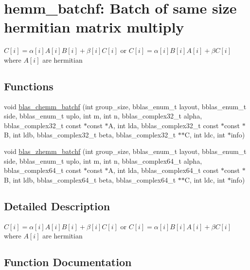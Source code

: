 \hypertarget{group__hemm__batchf}{}\section{hemm\+\_\+batchf\+: Batch of same size hermitian matrix multiply}
\label{group__hemm__batchf}


$ C[i] = \alpha[i] A[i] B[i] + \beta[i] C[i] $ or $ C[i] = \alpha[i] B[i] A[i] + \beta C[i] $ where $ A[i] $ are hermitian  


\subsection*{Functions}
\begin{DoxyCompactItemize}
\item 
void \hyperlink{group__hemm__batchf_ga76250ab55350229248296033e39c68cc}{blas\+\_\+chemm\+\_\+batchf} (int group\+\_\+size, bblas\+\_\+enum\+\_\+t layout, bblas\+\_\+enum\+\_\+t side, bblas\+\_\+enum\+\_\+t uplo, int m, int n, bblas\+\_\+complex32\+\_\+t alpha, bblas\+\_\+complex32\+\_\+t const $\ast$const $\ast$A, int lda, bblas\+\_\+complex32\+\_\+t const $\ast$const $\ast$B, int ldb, bblas\+\_\+complex32\+\_\+t beta, bblas\+\_\+complex32\+\_\+t $\ast$$\ast$C, int ldc, int $\ast$info)
\item 
void \hyperlink{group__hemm__batchf_gaf6cd524bb78c2bab51170b200b76cfa8}{blas\+\_\+zhemm\+\_\+batchf} (int group\+\_\+size, bblas\+\_\+enum\+\_\+t layout, bblas\+\_\+enum\+\_\+t side, bblas\+\_\+enum\+\_\+t uplo, int m, int n, bblas\+\_\+complex64\+\_\+t alpha, bblas\+\_\+complex64\+\_\+t const $\ast$const $\ast$A, int lda, bblas\+\_\+complex64\+\_\+t const $\ast$const $\ast$B, int ldb, bblas\+\_\+complex64\+\_\+t beta, bblas\+\_\+complex64\+\_\+t $\ast$$\ast$C, int ldc, int $\ast$info)
\end{DoxyCompactItemize}


\subsection{Detailed Description}
$ C[i] = \alpha[i] A[i] B[i] + \beta[i] C[i] $ or $ C[i] = \alpha[i] B[i] A[i] + \beta C[i] $ where $ A[i] $ are hermitian 



\subsection{Function Documentation}
